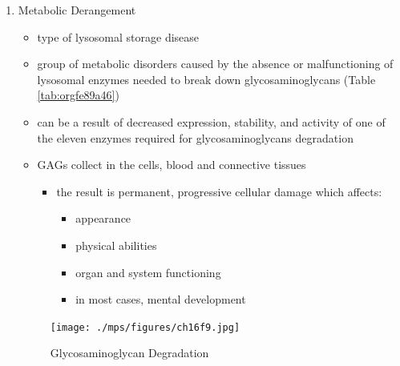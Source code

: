\documentclass{scrartcl}
\begin{document}
\begin{enumerate}
\item Metabolic Derangement
\label{sec:org82b43ca}
\begin{itemize}
\item type of lysosomal storage disease
\item group of metabolic disorders caused by the absence or malfunctioning
of lysosomal enzymes needed to break down glycosaminoglycans (Table \ref{tab:orgfe89a46})
\item can be a result of decreased expression, stability, and activity of
one of the eleven enzymes required for glycosaminoglycans
degradation
\item GAGs collect in the cells, blood and connective tissues
\begin{itemize}
\item the result is permanent, progressive cellular damage which affects:
\begin{itemize}
\item appearance
\item physical abilities
\item organ and system functioning
\item in most cases, mental development
\end{itemize}
\end{itemize}
\end{itemize}

\begin{figure}[htbp]
\centering
\texttt{[image: ./mps/figures/ch16f9.jpg]}
\caption[Glycosaminoglycan Degradation]{\label{fig:orgdf865d7}
Glycosaminoglycan Degradation}
\end{figure}


\end{enumerate}
\end{document}
